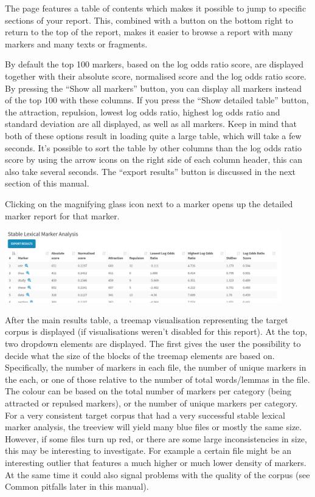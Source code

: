 \documentclass[11pt,a4paper]{article}
\begin{document}
The page features a table of contents which makes it possible to jump to specific sections of your report. This, combined with a button on the bottom right to return to the top of the report, makes it easier to browse a report with many markers and many texts or fragments. 

By default the top 100 markers, based on the log odds ratio score, are displayed together with their absolute score, normalised score and the log odds ratio score. By pressing the ``Show all markers'' button, you can display all markers instead of the top 100 with these columns. If you press the ``Show detailed table'' button, the attraction, repulsion, lowest log odds ratio, highest log odds ratio and standard deviation are all displayed, as well as all markers. Keep in mind that both of these options result in loading quite a large table, which will take a few seconds. It's possible to sort the table by other columns than the log odds ratio score by using the arrow icons on the right side of each column header, this can also take several seconds. The ``export results'' button is discussed in the next section of this manual.

Clicking on the magnifying glass icon next to a marker opens up the detailed marker report for that marker.

\centerline{\includegraphics[width=0.9\textwidth]{images/mainreport_detailtable.png}}

After the main results table, a treemap visualisation representing the target corpus is displayed (if visualisations weren't disabled for this report). At the top, two dropdown elements are displayed. The first gives the user the possibility to decide what the size of the blocks of the treemap elements are based on. Specifically, the number of markers in each file, the number of unique markers in the each, or one of those relative to the number of total words/lemmas in the file. The colour can be based on the total number of markers per category (being attracted or repulsed markers), or the number of unique markers per category. For a very consistent target corpus that had a very successful stable lexical marker analysis, the treeview will yield many blue files or mostly the same size. However, if some files turn up red, or there are some large inconsistencies in size, this may be interesting to investigate. For example a certain file might be an interesting outlier that features a much higher or much lower density of markers. At the same time it could also signal problems with the quality of the corpus (see Common pitfalls later in this manual).
\end{document}

